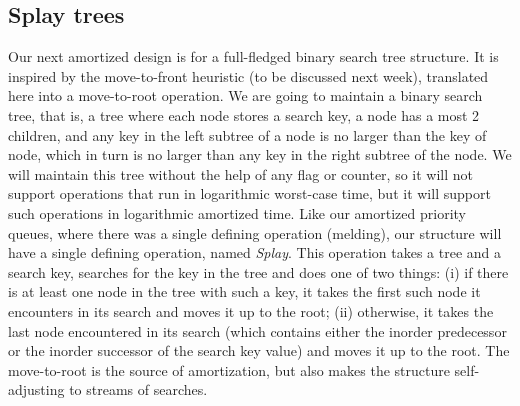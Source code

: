 \documentclass[11pt]{article}
\begin{document}
\subsection*{Splay trees}
Our next amortized design is for a full-fledged binary search tree structure.
It is inspired by the move-to-front heuristic (to be discussed next week),
translated here into a move-to-root operation.  We are going to maintain a
binary search tree, that is, a tree where each node stores a search key, a
node has a most 2 children, and any key in the left subtree of a node is
no larger than the key of node, which in turn is no larger than any key in the
right subtree of the node.  We will maintain this tree without the help of any
flag or counter, so it will not support operations that run in logarithmic
worst-case time, but it will support such operations in logarithmic amortized
time.  Like our amortized priority queues, where there was a single defining
operation (melding), our structure will have a single defining operation,
named \emph{Splay}.  This operation takes a tree and a search key, searches
for the key in the tree and does one of two things: (i) if there is at least
one node in the tree with such a key, it takes the first such node it encounters in its search and moves it up to the root; (ii) otherwise, it takes the last
node encountered in its search (which contains either the inorder predecessor
or the inorder successor of the search key value) and moves it up to the root.
The move-to-root is the source of amortization, but also makes the structure
self-adjusting to streams of searches.
\end{document}
